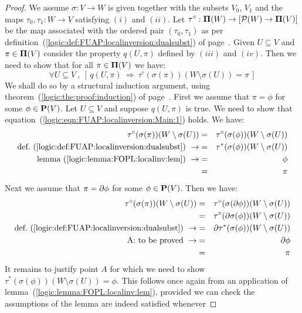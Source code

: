 \begin{proof}
We assume $\sigma:V\to W$ is given together with the subsets
$V_{0}$, $V_{1}$ and the maps $\tau_{0},\tau_{1}:W\to V$ satisfying
$(i)$ and $(ii)$. Let $\tau^{\circ}:{\bf\Pi}(W)\to[{\cal
P}(W)\to\mbox{${\bf\Pi}(V)$}]$ be the map associated with the ordered pair
$(\tau_{0},\tau_{1})$ as per
definition~(\ref{logic:def:FUAP:localinversion:dualsubst}) of
page~\pageref{logic:def:FUAP:localinversion:dualsubst}. Given
$U\subseteq V$ and $\pi\in\mbox{${\bf\Pi}(V)$}$ consider the property $q(U,\pi)$
defined by $(iii)$ and $(iv)$. Then we need to show that for all
$\pi\in\mbox{${\bf\Pi}(V)$}$ we have:
    \[
    \forall U\subseteq V\ ,\ [\,q(U,\pi)\ \Rightarrow\
    \tau^{\circ}(\sigma(\pi))(W\setminus\sigma(U))=\pi\,]
    \]
We shall do so by a structural induction argument, using
theorem~(\ref{logic:the:proof:induction}) of
page~\pageref{logic:the:proof:induction}. First we assume that
$\pi=\phi$ for some $\phi\in\mbox{${\bf P}(V)$}$. Let $U\subseteq V$ and suppose
$q(U,\pi)$ is true. We need to show that
equation~(\ref{logic:eqn:FUAP:localinversion:Main:1}) holds. We
have:
    \begin{eqnarray*}
    \tau^{\circ}(\sigma(\pi))(W\setminus\sigma(U))&=&\tau^{\circ}(\sigma(\phi))(W\setminus\sigma(U))\\
    \mbox{def.~(\ref{logic:def:FUAP:localinversion:dualsubst})}\ \rightarrow
    &=&\tau^{*}(\sigma(\phi))(W\setminus\sigma(U))\\
    \mbox{lemma~(\ref{logic:lemma:FOPL:localinv:lem})}\ \rightarrow&=&\phi\\
    &=&\pi
    \end{eqnarray*}
Next we assume that $\pi=\mbox{$\partial$}\phi$ for some $\phi\in\mbox{${\bf P}(V)$}$. Then we
have:
    \begin{eqnarray*}
    \tau^{\circ}(\sigma(\pi))(W\setminus\sigma(U))&=&\tau^{\circ}(\sigma(\axi\phi))(W\setminus\sigma(U))\\
    &=&\tau^{\circ}(\axi\sigma(\phi))(W\setminus\sigma(U))\\
    \mbox{def.~(\ref{logic:def:FUAP:localinversion:dualsubst})}\ \rightarrow
    &=&\axi\tau^{*}(\sigma(\phi))(W\setminus\sigma(U))\\
    \mbox{A: to be proved}\ \rightarrow&=&\axi\phi\\
    &=&\pi
    \end{eqnarray*}
It remains to justify point $A$ for which we need to show
$\tau^{*}(\sigma(\phi))(W\setminus\sigma(U))=\phi$. This follows
once again from an application of
lemma~(\ref{logic:lemma:FOPL:localinv:lem}), provided we can check
the assumptions of the lemma are indeed satisfied whenever

\end{proof}

